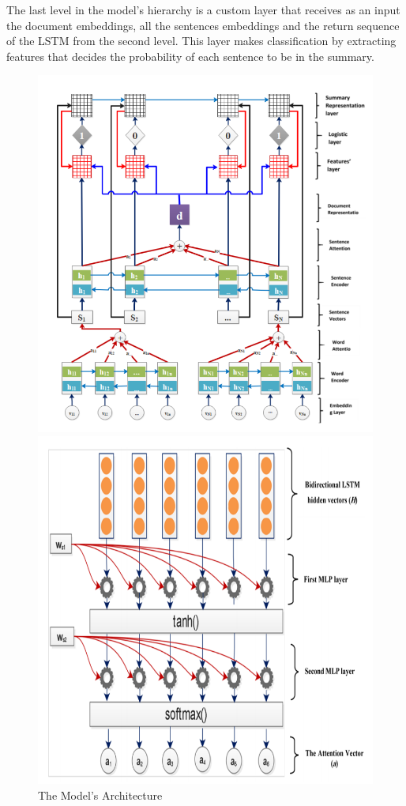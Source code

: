 \documentclass{article}
\begin{document}
The last level in the model's hierarchy is a custom layer that receives as an input the document embeddings, all the sentences embeddings and the return sequence of the LSTM from the second level. This layer makes classification by extracting features that decides the probability of each sentence to be in the summary.

\begin{figure}
\begin{minipage}{.5\textwidth}
    \includegraphics[scale=0.7]{Architecture.PNG}
    \caption{The Model's Architecture}
    \label{fig:architecture}
\end{minipage}
\begin{minipage}{.5\textwidth}
    \includegraphics[scale=0.7]{Attention.PNG}

\end{minipage}
\end{figure}
\end{document}
